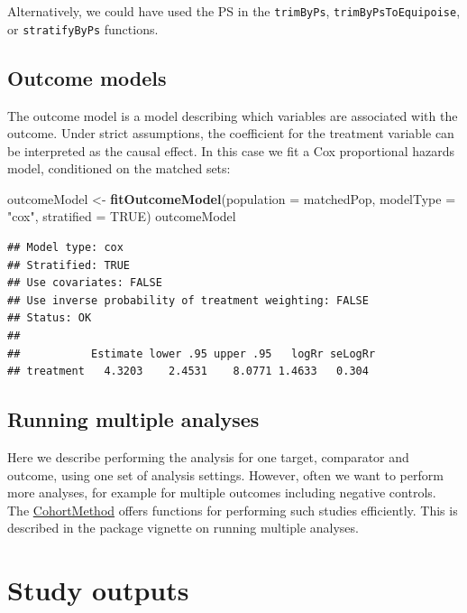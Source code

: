 \documentclass[11pt]{book}
\newenvironment{Shaded}{\begin{snugshade}}{\end{snugshade}}
\newcommand{\KeywordTok}[1]{\textcolor[rgb]{0.13,0.29,0.53}{\textbf{#1}}}
\newcommand{\DataTypeTok}[1]{\textcolor[rgb]{0.13,0.29,0.53}{#1}}
\newcommand{\StringTok}[1]{\textcolor[rgb]{0.31,0.60,0.02}{#1}}
\newcommand{\OtherTok}[1]{\textcolor[rgb]{0.56,0.35,0.01}{#1}}
\newcommand{\NormalTok}[1]{#1}
\begin{document}
Alternatively, we could have used the PS in the \texttt{trimByPs},
\texttt{trimByPsToEquipoise}, or \texttt{stratifyByPs} functions.

\subsection{Outcome models}\label{outcome-models}

The outcome model is a model describing which variables are associated
with the outcome. Under strict assumptions, the coefficient for the
treatment variable can be interpreted as the causal effect. In this case
we fit a Cox proportional hazards model, conditioned on the matched
sets:

\begin{Shaded}
\begin{Highlighting}[]
\NormalTok{outcomeModel <-}\StringTok{ }\KeywordTok{fitOutcomeModel}\NormalTok{(}\DataTypeTok{population =}\NormalTok{ matchedPop,}
                                \DataTypeTok{modelType =} \StringTok{"cox"}\NormalTok{,}
                                \DataTypeTok{stratified =} \OtherTok{TRUE}\NormalTok{)}
\NormalTok{outcomeModel}
\end{Highlighting}
\end{Shaded}

\begin{verbatim}
## Model type: cox
## Stratified: TRUE
## Use covariates: FALSE
## Use inverse probability of treatment weighting: FALSE
## Status: OK
## 
##           Estimate lower .95 upper .95   logRr seLogRr
## treatment   4.3203    2.4531    8.0771 1.4633   0.304
\end{verbatim}

\subsection{Running multiple analyses}\label{running-multiple-analyses}

Here we describe performing the analysis for one target, comparator and
outcome, using one set of analysis settings. However, often we want to
perform more analyses, for example for multiple outcomes including
negative controls. The
\href{https://ohdsi.github.io/CohortMethod/}{CohortMethod} offers
functions for performing such studies efficiently. This is described in
the package vignette on running multiple analyses.

\section{Study outputs}\label{studyOutputs}
\end{document}
